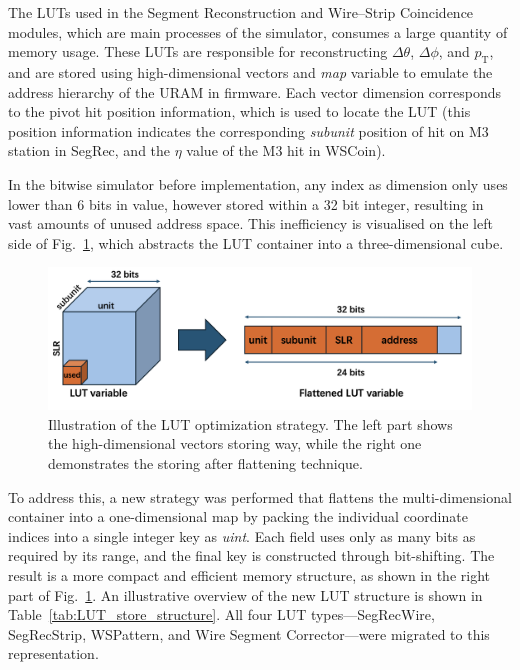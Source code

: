 The LUTs used in the Segment Reconstruction and Wire–Strip Coincidence modules, which are main processes of the simulator, consumes a large quantity of memory usage. These LUTs are responsible for reconstructing $\Delta\theta$, $\Delta\phi$, and $p_{\mathrm{T}}$, and are stored using high-dimensional vectors and \textit{map} variable to emulate the address hierarchy of the URAM in firmware. Each vector dimension corresponds to the pivot hit position information, which is used to locate the LUT (this position information indicates the corresponding \textit{subunit} position of hit on M3 station in SegRec, and the $\eta$ value of the M3 hit in WSCoin). 

In the bitwise simulator before implementation, any index as dimension only uses lower than 6 bits in value, however stored within a 32 bit integer, resulting in vast amounts of unused address space. This inefficiency is visualised on the left side of Fig.~\ref{fig:LUT_optimization}, which abstracts the LUT container into a three-dimensional cube.
\begin{figure}[htbp]
  \centering
  \includegraphics[width=1.0\textwidth]{figs/chapter5/LUT_optimization.png}
  \caption{Illustration of the LUT optimization strategy. The left part shows the high-dimensional vectors storing way, while the right one demonstrates the storing after flattening technique.}
  \label{fig:LUT_optimization}
\end{figure}

To address this, a new strategy was performed that flattens the multi-dimensional container into a one-dimensional map by packing the individual coordinate indices into a single integer key as \textit{uint}. Each field uses only as many bits as required by its range, and the final key is constructed through bit-shifting. The result is a more compact and efficient memory structure, as shown in the right part of Fig.~\ref{fig:LUT_optimization}. An illustrative overview of the new LUT structure is shown in Table~\ref{tab:LUT_store_structure}. All four LUT types—SegRecWire, SegRecStrip, WSPattern, and Wire Segment Corrector—were migrated to this representation.


